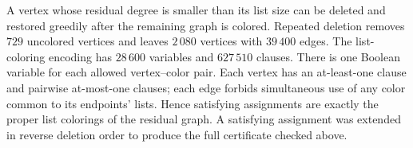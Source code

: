 \begin{remark}\label{rem:degree-deletion}
A vertex whose residual degree is smaller than its list size can be
deleted and restored greedily after the remaining graph is colored.
Repeated deletion removes \(729\) uncolored vertices and leaves
\(2\,080\) vertices with \(39\,400\) edges.  The list-coloring
encoding has \(28\,600\) variables and \(627\,510\) clauses.  There
is one Boolean variable for each allowed vertex--color pair.  Each
vertex has an at-least-one clause and pairwise at-most-one clauses;
each edge forbids simultaneous use of any color common to its
endpoints' lists.  Hence satisfying assignments are exactly the
proper list colorings of the residual graph.  A satisfying
assignment was extended in reverse deletion order to produce the
full certificate checked above.
\end{remark}
